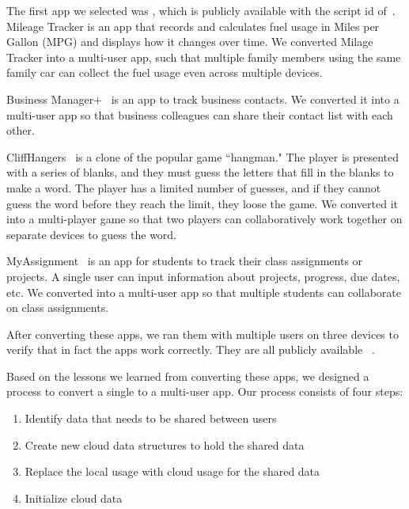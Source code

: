 \documentclass{sigplanconf}
\begin{document}
The first app we selected was \MT, which is publicly available with the script id of~\cite{MileageTracker}.  Mileage Tracker is an app that records and calculates fuel usage in Miles per Gallon (MPG) and displays how it changes over time. We converted Milage Tracker into a multi-user app, such that multiple family members using the same family car can collect the fuel usage even across multiple devices.

Business Manager+~\cite{BusinessManager} is an app to track business contacts.  We converted it into a multi-user app so that business colleagues can share their contact list with each other.

CliffHangers~\cite{CliffHangers} is a clone of the popular game ``hangman."  The player is presented with a series of blanks, and they must guess the letters that fill in the blanks to make a word.  The player has a limited number of guesses, and if they cannot guess the word before they reach the limit, they loose the game.  We converted it into a multi-player game so that two players can collaboratively work together on separate devices to guess the word.

MyAssignment~\cite{MyAssignments} is an app for students to track their class assignments or projects.  A single user can input information about projects, progress, due dates, etc.  We converted into a multi-user app so that multiple students can collaborate on class assignments.

After converting these apps, we ran them with multiple users on three devices to verify that in fact the apps work correctly. They are all publicly available~\cite{MileageTrackerFinal,BusinessManagerFinal,CliffHangersFinal,MyAssignmentsFinal} .

Based on the lessons we learned from converting these \numFormative apps, we designed a process to convert  a single to a multi-user app.  Our process consists of four steps:   
\begin{enumerate}
\item Identify data that needs to be shared between users

\item Create new cloud data structures to hold the shared data

\item Replace the local usage with cloud usage for the shared data

\item Initialize cloud data
\end{enumerate}
\end{document}
